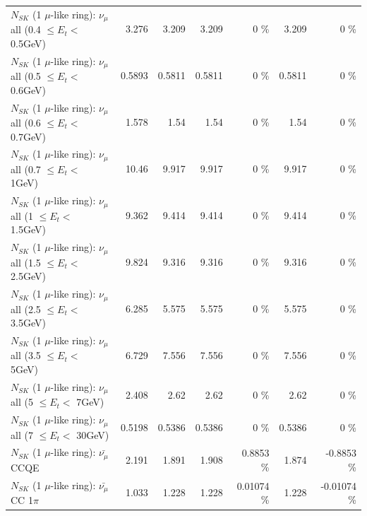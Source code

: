 \begin{table}
\begin{tabular}{| l | r | r | r  r | r  r |}
       $N_{SK}$ (1 $\mu$-like ring): $\nu_{\mu}$ all (0.4 $\leq E_{t} <$ 0.5GeV) &           3.276 &           3.209 &           3.209 &        0 \%  &           3.209 &        0 \%  \\ 
       $N_{SK}$ (1 $\mu$-like ring): $\nu_{\mu}$ all (0.5 $\leq E_{t} <$ 0.6GeV) &          0.5893 &          0.5811 &          0.5811 &        0 \%  &          0.5811 &        0 \%  \\ 
       $N_{SK}$ (1 $\mu$-like ring): $\nu_{\mu}$ all (0.6 $\leq E_{t} <$ 0.7GeV) &           1.578 &            1.54 &            1.54 &        0 \%  &            1.54 &        0 \%  \\ 
         $N_{SK}$ (1 $\mu$-like ring): $\nu_{\mu}$ all (0.7 $\leq E_{t} <$ 1GeV) &           10.46 &           9.917 &           9.917 &        0 \%  &           9.917 &        0 \%  \\ 
         $N_{SK}$ (1 $\mu$-like ring): $\nu_{\mu}$ all (1 $\leq E_{t} <$ 1.5GeV) &           9.362 &           9.414 &           9.414 &        0 \%  &           9.414 &        0 \%  \\ 
       $N_{SK}$ (1 $\mu$-like ring): $\nu_{\mu}$ all (1.5 $\leq E_{t} <$ 2.5GeV) &           9.824 &           9.316 &           9.316 &        0 \%  &           9.316 &        0 \%  \\ 
       $N_{SK}$ (1 $\mu$-like ring): $\nu_{\mu}$ all (2.5 $\leq E_{t} <$ 3.5GeV) &           6.285 &           5.575 &           5.575 &        0 \%  &           5.575 &        0 \%  \\ 
         $N_{SK}$ (1 $\mu$-like ring): $\nu_{\mu}$ all (3.5 $\leq E_{t} <$ 5GeV) &           6.729 &           7.556 &           7.556 &        0 \%  &           7.556 &        0 \%  \\ 
           $N_{SK}$ (1 $\mu$-like ring): $\nu_{\mu}$ all (5 $\leq E_{t} <$ 7GeV) &           2.408 &            2.62 &            2.62 &        0 \%  &            2.62 &        0 \%  \\ 
          $N_{SK}$ (1 $\mu$-like ring): $\nu_{\mu}$ all (7 $\leq E_{t} <$ 30GeV) &          0.5198 &          0.5386 &          0.5386 &        0 \%  &          0.5386 &        0 \%  \\ 
\hline
\hline
\hline
                              $N_{SK}$ (1 $\mu$-like ring): $\bar{\nu_\mu}$ CCQE &           2.191 &           1.891 &           1.908 &   0.8853 \%  &           1.874 &  -0.8853 \%  \\ 
                         $N_{SK}$ (1 $\mu$-like ring): $\bar{\nu_\mu}$ CC 1$\pi$ &           1.033 &           1.228 &           1.228 &  0.01074 \%  &           1.228 & -0.01074 \%  \\ 

\end{tabular}
\end{table}

